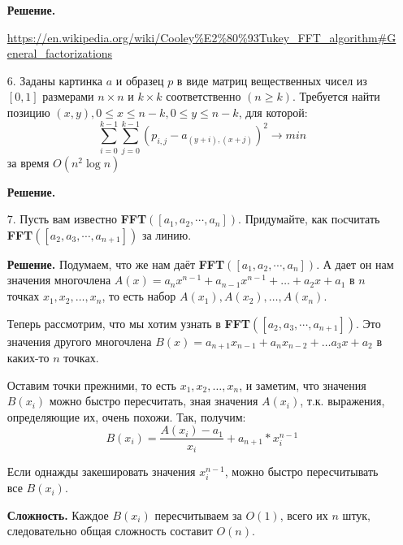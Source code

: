 \begin{enumerate}
	\textbf{Решение.}
	
	\url{https://en.wikipedia.org/wiki/Cooley%E2%80%93Tukey_FFT_algorithm#General_factorizations}
	
	\item[6.] Заданы картинка $a$ и образец $p$ в виде матриц вещественных чисел из $[0, 1]$ размерами $n \times n$ 
	и $k \times k$ соответственно $(n \geqslant k)$. Требуется найти позицию $(x, y), 0 \leqslant x \leqslant n - 
	k, 0 \leqslant y \leqslant n - k$, для которой:
	\begin{equation*}
		\sum\limits_{i = 0}^{k - 1} \sum\limits_{j = 0}^{k - 1} (p_{i,j} - a_{(y + i), (x + j)})^2 \rightarrow min
	\end{equation*}
	за время $O(n^2\log n)$
	
	\textbf{Решение.}
	
	\item[7.] Пусть вам известно \textbf{FFT}$([a_1, a_2, \cdots , a_n])$. Придумайте, как пoсчитать 
	\textbf{FFT}$([a_2, a_3, \cdots , a_{n+1}])$ за линию.
	
	\textbf{Решение.} Подумаем, что же нам даёт \textbf{FFT}$([a_1, a_2, \cdots , a_n])$. А дает он нам значения 
	многочлена $A(x) = a_n x^{n - 1} + a_{n - 1} x^{n - 1} + \dots + a_2 x + a_1$ в $n$ точках $x_1, x_2, \dots, 
	x_n$, то есть набор $A(x_1), A(x_2), \dots, A(x_n)$.
	
	Теперь рассмотрим, что мы хотим узнать в \textbf{FFT}$([a_2, a_3, \cdots , a_{n+1}])$. Это значения другого 
	многочлена $B(x) = a_{n + 1} x_{n - 1} + a_n x_{n - 2} + \dots a_3 x + a_2$ в каких-то $n$ точках. 
	
	Оставим точки прежними, то есть  $x_1, x_2, \dots, x_n$, и заметим, что значения $B(x_i)$ можно быстро 
	пересчитать, зная значения $A(x_i)$, т.к. выражения, определяющие их, очень похожи. Так, получим:
	\begin{equation*}
		B(x_i) = \frac{A(x_i) - a_1}{x_i} + a_{n + 1} * x_i^{n - 1}
	\end{equation*}
	
	Если однажды закешировать значения $x_i^{n - 1}$, можно быстро пересчитывать все $B(x_i)$. 
	
	\textbf{Сложность.} Каждое $B(x_i)$ пересчитываем за $O(1)$, всего их $n$ штук, следовательно общая сложность 
	составит $O(n)$.
	
\end{enumerate}



